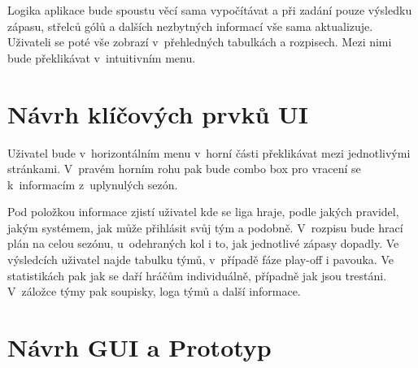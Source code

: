 \documentclass[11pt, a4paper, titlepage]{article}
\begin{document}
Logika aplikace bude spoustu věcí sama vypočítávat a při zadání pouze výsledku zápasu, střelců gólů a dalších nezbytných informací vše sama aktualizuje. Uživateli se poté vše zobrazí v~přehledných tabulkách a rozpisech. Mezi nimi bude překlikávat v~intuitivním menu.


\section{Návrh klíčových prvků UI}

Uživatel bude v~horizontálním menu v~horní části překlikávat mezi jednotlivými stránkami. V~pravém horním rohu pak bude combo box pro vracení se k~informacím z~uplynulých sezón.
\bigskip

Pod položkou informace zjistí uživatel kde se liga hraje, podle jakých pravidel, jakým systémem, jak může přihlásit svůj tým a podobně. V~rozpisu bude hrací plán na celou sezónu, u~odehraných kol i to, jak jednotlivé zápasy dopadly. Ve výsledcích uživatel najde tabulku týmů, v~případě fáze play-off i pavouka. Ve statistikách pak jak se daří hráčům individuálně, případně jak jsou trestáni. V~záložce týmy pak soupisky, loga týmů a další informace.


\newpage

\section{Návrh GUI a Prototyp}
\end{document}
